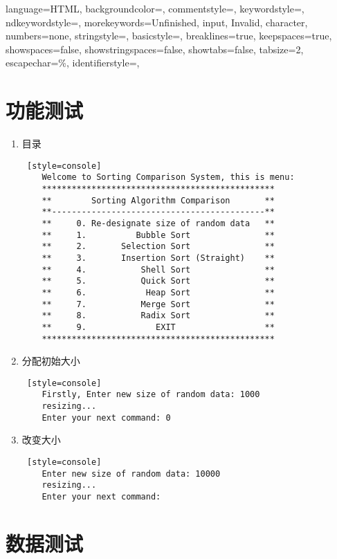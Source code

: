 

 {
    language=HTML,
    backgroundcolor=\color{CPPDark},   
    commentstyle=\color{CPPLight},
    keywordstyle=\color{red},
    ndkeywordstyle={},
    morekeywords={Unfinished, input, Invalid, character},
    numbers=none,
    stringstyle={},
    basicstyle=\fira\color{white}\footnotesize,
    breaklines=true,                                     
    keepspaces=true,                                     
    showspaces=false,                
    showstringspaces=false,
    showtabs=false,                  
    tabsize=2,
    escapechar=\%,
    identifierstyle={},
}

\chapter{功能测试}

\begin{enumerate}
    \item 目录
\begin{lstlisting} [style=console]
    Welcome to Sorting Comparison System, this is menu:
    ***********************************************
    **        Sorting Algorithm Comparison       **
    **-------------------------------------------**
    **     0. Re-designate size of random data   **
    **     1.          Bubble Sort               **
    **     2.       Selection Sort               **
    **     3.       Insertion Sort (Straight)    **
    **     4.           Shell Sort               **
    **     5.           Quick Sort               **
    **     6.            Heap Sort               **
    **     7.           Merge Sort               **
    **     8.           Radix Sort               **
    **     9.              EXIT                  **
    ***********************************************
\end{lstlisting}
    \item 分配初始大小
\begin{lstlisting} [style=console]
    Firstly, Enter new size of random data: 1000
    resizing...
    Enter your next command: 0
\end{lstlisting}
    \item 改变大小
\begin{lstlisting} [style=console]
    Enter new size of random data: 10000
    resizing...
    Enter your next command:  
\end{lstlisting}
\end{enumerate}


\chapter{数据测试}

